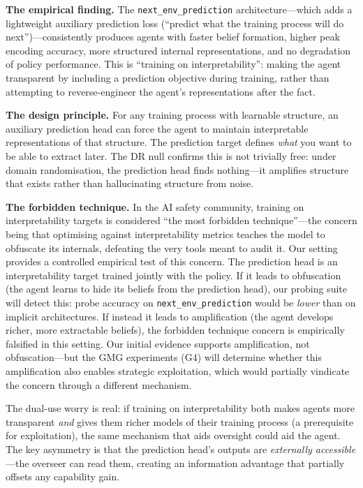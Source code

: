 \documentclass[11pt,a4paper]{article}
\theoremstyle{remark}
\begin{document}
\textbf{The empirical finding.} The \texttt{next\_env\_prediction} architecture---which adds a lightweight auxiliary prediction loss (``predict what the training process will do next'')---consistently produces agents with faster belief formation, higher peak encoding accuracy, more structured internal representations, and no degradation of policy performance. This is ``training on interpretability'': making the agent transparent by including a prediction objective during training, rather than attempting to reverse-engineer the agent's representations after the fact.

\textbf{The design principle.} For any training process with learnable structure, an auxiliary prediction head can force the agent to maintain interpretable representations of that structure. The prediction target defines \textit{what} you want to be able to extract later. The DR null confirms this is not trivially free: under domain randomisation, the prediction head finds nothing---it amplifies structure that exists rather than hallucinating structure from noise.

\textbf{The forbidden technique.} In the AI safety community, training on interpretability targets is considered ``the most forbidden technique''---the concern being that optimising against interpretability metrics teaches the model to obfuscate its internals, defeating the very tools meant to audit it. Our setting provides a controlled empirical test of this concern. The prediction head is an interpretability target trained jointly with the policy. If it leads to obfuscation (the agent learns to hide its beliefs from the prediction head), our probing suite will detect this: probe accuracy on \texttt{next\_env\_prediction} would be \textit{lower} than on implicit architectures. If instead it leads to amplification (the agent develops richer, more extractable beliefs), the forbidden technique concern is empirically falsified in this setting. Our initial evidence supports amplification, not obfuscation---but the GMG experiments (G4) will determine whether this amplification also enables strategic exploitation, which would partially vindicate the concern through a different mechanism.

The dual-use worry is real: if training on interpretability both makes agents more transparent \textit{and} gives them richer models of their training process (a prerequisite for exploitation), the same mechanism that aids oversight could aid the agent. The key asymmetry is that the prediction head's outputs are \textit{externally accessible}---the overseer can read them, creating an information advantage that partially offsets any capability gain.
\end{document}
